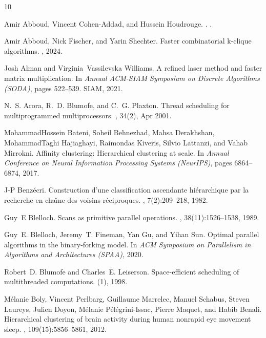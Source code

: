 \documentclass[11pt]{article}
\begin{document}
\newpage
\begin{thebibliography}{10}

Amir Abboud, Vincent Cohen-Addad, and Hussein Houdrouge.
.
.

Amir Abboud, Nick Fischer, and Yarin Shechter.
\newblock Faster combinatorial k-clique algorithms.
, 2024.

Josh Alman and Virginia~Vassilevska Williams.
\newblock A refined laser method and faster matrix multiplication.
\newblock In {\em Annual ACM-SIAM Symposium on Discrete Algorithms (SODA)}, pages 522--539. SIAM, 2021.

N.~S. Arora, R.~D. Blumofe, and C.~G. Plaxton.
\newblock Thread scheduling for multiprogrammed multiprocessors.
, 34(2), Apr 2001.

MohammadHossein Bateni, Soheil Behnezhad, Mahsa Derakhshan, MohammadTaghi Hajiaghayi, Raimondas Kiveris, Silvio Lattanzi, and Vahab Mirrokni.
\newblock Affinity clustering: Hierarchical clustering at scale.
\newblock In {\em Annual Conference on Neural Information Processing Systems (NeurIPS)}, pages 6864--6874, 2017.

J-P Benz{\'e}cri.
\newblock Construction d'une classification ascendante hi{\'e}rarchique par la recherche en cha{\^\i}ne des voisins r{\'e}ciproques.
, 7(2):209--218, 1982.

Guy~E Blelloch.
\newblock Scans as primitive parallel operations.
, 38(11):1526--1538, 1989.

Guy~E. Blelloch, Jeremy~T. Fineman, Yan Gu, and Yihan Sun.
\newblock Optimal parallel algorithms in the binary-forking model.
\newblock In {\em {ACM} Symposium on Parallelism in Algorithms and Architectures (SPAA)}, 2020.

Robert~D. Blumofe and Charles~E. Leiserson.
\newblock Space-efficient scheduling of multithreaded computations.
(1), 1998.

M{\'e}lanie Boly, Vincent Perlbarg, Guillaume Marrelec, Manuel Schabus, Steven Laureys, Julien Doyon, M{\'e}lanie P{\'e}l{\'e}grini-Issac, Pierre Maquet, and Habib Benali.
\newblock Hierarchical clustering of brain activity during human nonrapid eye movement sleep.
, 109(15):5856--5861, 2012.


\end{thebibliography}
\end{document}
